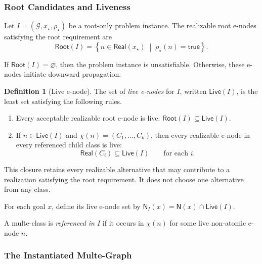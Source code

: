 \documentclass[sigconf,nonacm]{acmart}
\theoremstyle{definition}
\newtheorem{definition}{Definition}[section]
\theoremstyle{plain}
\theoremstyle{remark}
\begin{document}
\subsubsection{Root Candidates and Liveness}

Let \(I=(\mathcal G,x_\star,\rho_\star)\)
be a root-only problem instance.
The realizable root e-nodes satisfying the root requirement are
\[
\mathsf{Root}(I)
=
\left\{
n\in\mathsf{Real}(x_\star)
\;\middle|\;
\rho_\star(n)=\mathsf{true}
\right\}.
\]

If \(\mathsf{Root}(I)=\varnothing\),
then the problem instance is unsatisfiable.
Otherwise, these e-nodes initiate downward propagation.

\begin{definition}[Live e-node]
The set of \emph{live e-nodes} for \(I\), written
\(\mathsf{Live}(I)\),
is the least set satisfying the following rules.

\begin{enumerate}

\item
Every acceptable realizable root e-node is live:
\(\mathsf{Root}(I)\subseteq\mathsf{Live}(I)\).

\item
If \(n\in\mathsf{Live}(I)\) and
\(\chi(n)=(C_1,\ldots,C_k)\),
then every realizable e-node in every referenced child class is live:
\[
\mathsf{Real}(C_i)\subseteq\mathsf{Live}(I)
\qquad
\text{for each }i.
\]

\end{enumerate}
\end{definition}

This closure retains every realizable alternative that may contribute
to a realization satisfying the root requirement.  It does not choose
one alternative from any class.

For each goal \(x\), define its live e-node set by
\(\mathsf N_I(x) = \mathsf N(x)\cap\mathsf{Live}(I)\).

A multe-class is \emph{referenced in \(I\)} if it occurs in
\(\chi(n)\) for some live non-atomic e-node \(n\).

\subsubsection{The Instantiated Multe-Graph}
\end{document}
